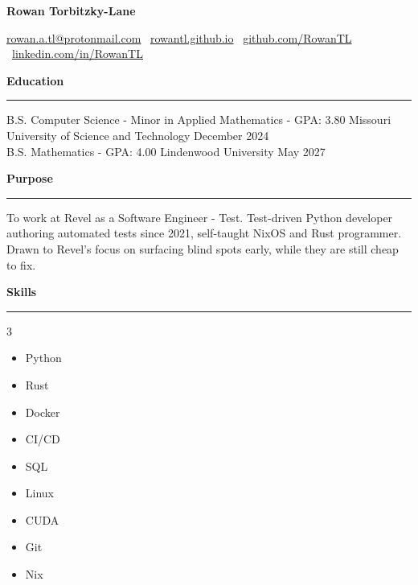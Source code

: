 \documentclass[11pt]{article}
\begin{document}
\begin{center}
    \textbf{\Huge Rowan Torbitzky-Lane}\\
    \hrulefill
\end{center}

\begin{center}
    \href{mailto:rowan.a.tl@protonmail.com}{rowan.a.tl@protonmail.com} \textbullet \ \href{https://rowantl.github.io/}{rowantl.github.io} \textbullet \ \href{https://github.com/RowanTL}{github.com/RowanTL} \textbullet \ \href{https://www.linkedin.com/in/rowantl/}{linkedin.com/in/RowanTL}
\end{center}

\textbf{Education}\par
\vspace{-12pt}
\noindent\rule{\textwidth}{0.4pt}

B.S. Computer Science - Minor in Applied Mathematics - GPA: 3.80 \tiny{Missouri University of Science and Technology} \hfill \normalsize{December 2024} \\
B.S. Mathematics - GPA: 4.00 \tiny{Lindenwood University} \hfill \normalsize{May 2027}

\textbf{Purpose}\par
\vspace{-12pt}
\noindent\rule{\textwidth}{0.4pt}

To work at Revel as a Software Engineer - Test. Test-driven Python developer authoring automated tests since 2021, 
self-taught NixOS and Rust programmer. Drawn to Revel's focus on surfacing blind spots early, while they are still cheap to fix.

\textbf{Skills}\par
\vspace{-12pt}
\noindent\rule{\textwidth}{0.4pt}
\vspace{-24pt}
\begin{multicols}{3}
    \begin{itemize}[noitemsep, topsep=0pt, partopsep=0pt, parsep=0pt, itemsep=0pt]
        \small
        \item Python
        \item Rust
        \item Docker
        \item CI/CD
        \item SQL
        \item Linux
        \item CUDA
        \item Git
        \item Nix
    \end{itemize}
\end{multicols}
\vspace{-10pt}
\end{document}
